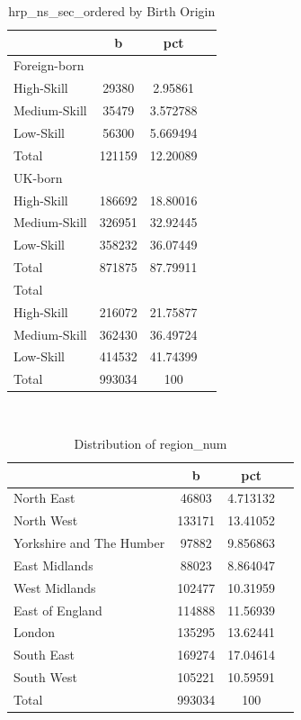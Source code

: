 \documentclass[12pt, a4paper]{article}
\begin{document}
\begin{table}[H]\centering
\def\sym#1{\ifmmode^{#1}\else\(^{#1}\)\fi}
\begin{tabularx}{\textwidth}{@{}lCCC@{}}
\hline\hline
                    &           b&         pct\\
\hline
Foreign-born        &            &            \\
High-Skill          &       29380&     2.95861\\
Medium-Skill        &       35479&    3.572788\\
Low-Skill           &       56300&    5.669494\\
Total               &      121159&    12.20089\\
\hline
UK-born             &            &            \\
High-Skill          &      186692&    18.80016\\
Medium-Skill        &      326951&    32.92445\\
Low-Skill           &      358232&    36.07449\\
Total               &      871875&    87.79911\\
\hline
Total               &            &            \\
High-Skill          &      216072&    21.75877\\
Medium-Skill        &      362430&    36.49724\\
Low-Skill           &      414532&    41.74399\\
Total               &      993034&         100\\
\hline\hline
\end{tabularx} \\
  \caption{hrp\_ns\_sec\_ordered by Birth Origin}
\end{table}

\begin{table}[H]\centering
\def\sym#1{\ifmmode^{#1}\else\(^{#1}\)\fi}
\begin{tabularx}{\textwidth}{@{}lCCC@{}}
\hline\hline
                    &           b&         pct\\
\hline
North East           &       46803&    4.713132\\
North West           &      133171&    13.41052\\
Yorkshire and The Humber           &       97882&    9.856863\\
East Midlands           &       88023&    8.864047\\
West Midlands           &      102477&    10.31959\\
East of England           &      114888&    11.56939\\
London           &      135295&    13.62441\\
South East           &      169274&    17.04614\\
South West           &      105221&    10.59591\\
Total               &      993034&         100\\
\hline\hline
\end{tabularx} \\
\caption{Distribution of region\_num}
\end{table}
\end{document}
